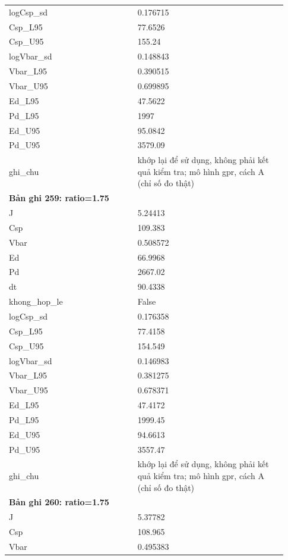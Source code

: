 \begin{longtable}{p{0.43\linewidth}p{0.50\linewidth}}
logCsp\_\allowbreak sd & 0.176715 \\
Csp\_\allowbreak L95 & 77.6526 \\
Csp\_\allowbreak U95 & 155.24 \\
logVbar\_\allowbreak sd & 0.148843 \\
Vbar\_\allowbreak L95 & 0.390515 \\
Vbar\_\allowbreak U95 & 0.699895 \\
Ed\_\allowbreak L95 & 47.5622 \\
Pd\_\allowbreak L95 & 1997 \\
Ed\_\allowbreak U95 & 95.0842 \\
Pd\_\allowbreak U95 & 3579.09 \\
ghi\_\allowbreak chu & khớp lại để sử dụng, không phải kết quả kiểm tra; mô hình gpr, cách A (chỉ số đo thật) \\
\midrule
\multicolumn{2}{p{0.95\linewidth}}{\textbf{Bản ghi 259: ratio=1.75}} \\
J & 5.24413 \\
Csp & 109.383 \\
Vbar & 0.508572 \\
Ed & 66.9968 \\
Pd & 2667.02 \\
dt & 90.4338 \\
khong\_\allowbreak hop\_\allowbreak le & False \\
logCsp\_\allowbreak sd & 0.176358 \\
Csp\_\allowbreak L95 & 77.4158 \\
Csp\_\allowbreak U95 & 154.549 \\
logVbar\_\allowbreak sd & 0.146983 \\
Vbar\_\allowbreak L95 & 0.381275 \\
Vbar\_\allowbreak U95 & 0.678371 \\
Ed\_\allowbreak L95 & 47.4172 \\
Pd\_\allowbreak L95 & 1999.45 \\
Ed\_\allowbreak U95 & 94.6613 \\
Pd\_\allowbreak U95 & 3557.47 \\
ghi\_\allowbreak chu & khớp lại để sử dụng, không phải kết quả kiểm tra; mô hình gpr, cách A (chỉ số đo thật) \\
\midrule
\multicolumn{2}{p{0.95\linewidth}}{\textbf{Bản ghi 260: ratio=1.75}} \\
J & 5.37782 \\
Csp & 108.965 \\
Vbar & 0.495383 \\

\end{longtable}
